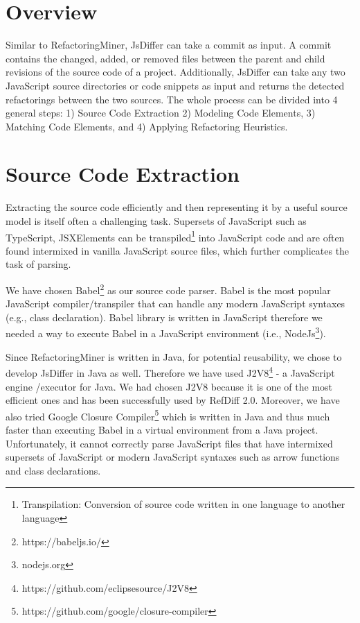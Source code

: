\documentclass[letterpaper,12pt,onecolumn,final]{report}
\begin{document}
\section *{Overview}

Similar to RefactoringMiner, JsDiffer can take a commit as input. A commit contains the changed, added, or removed files between the parent and child revisions of the source code of a project. Additionally, JsDiffer can take any two JavaScript source directories or code snippets as input and returns the detected refactorings between the two sources. The whole process can be divided into 4 general steps: 1) Source Code Extraction 2) Modeling Code Elements, 3) Matching Code Elements, and 4) Applying Refactoring Heuristics.


\section {Source Code Extraction}
Extracting the source code efficiently and then representing it by a useful source model is itself often a challenging task. Supersets of JavaScript such as TypeScript, JSXElements can be transpiled\footnote{Transpilation: Conversion of source code written in one language to another language} into JavaScript code and are often found intermixed in vanilla JavaScript source files, which further complicates the task of parsing.

We have chosen Babel\footnote{https://babeljs.io/} as our source code parser. Babel is the most popular JavaScript compiler/transpiler that can handle any modern JavaScript syntaxes (e.g., class declaration). Babel library is written in JavaScript therefore we needed a way to execute Babel in a JavaScript environment (i.e., NodeJs\footnote{nodejs.org}).

Since RefactoringMiner is written in Java, for potential reusability, we chose to develop JsDiffer in Java as well. Therefore we have used J2V8\footnote{https://github.com/eclipsesource/J2V8} - a JavaScript engine /executor for Java. We had chosen J2V8 because it is one of the most efficient ones and has been successfully used by RefDiff 2.0\cite{Silva2020}. Moreover, we have also tried Google Closure Compiler\footnote{https://github.com/google/closure-compiler} which is written in Java and thus much faster than executing Babel in a virtual environment from a Java project. Unfortunately, it cannot correctly parse JavaScript files that have intermixed supersets of JavaScript or modern JavaScript syntaxes such as arrow functions and class declarations.
\end{document}
